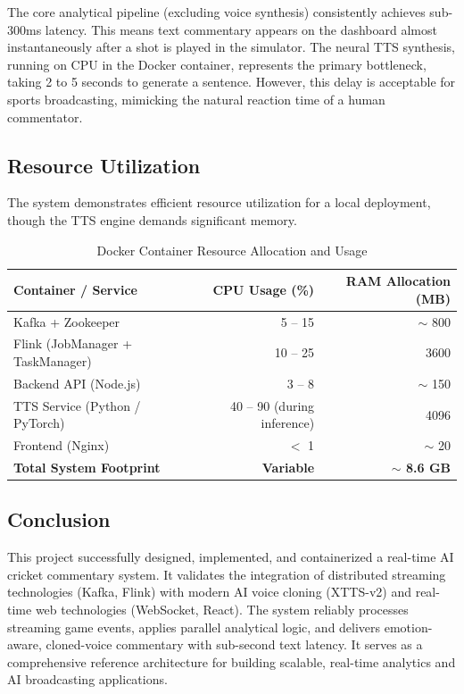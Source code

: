 \documentclass[12pt,a4paper]{article}
\begin{document}
The core analytical pipeline (excluding voice synthesis) consistently achieves sub-300ms latency. This means text commentary appears on the dashboard almost instantaneously after a shot is played in the simulator. The neural TTS synthesis, running on CPU in the Docker container, represents the primary bottleneck, taking 2 to 5 seconds to generate a sentence. However, this delay is acceptable for sports broadcasting, mimicking the natural reaction time of a human commentator.

\subsection{Resource Utilization}

The system demonstrates efficient resource utilization for a local deployment, though the TTS engine demands significant memory.

\begin{table}[H]
\centering
\caption{Docker Container Resource Allocation and Usage}
\label{tab:resources}
\begin{tabular}{@{}lrr@{}}
\toprule
\textbf{Container / Service} & \textbf{CPU Usage (\%)} & \textbf{RAM Allocation (MB)} \\
\midrule
Kafka + Zookeeper & 5 -- 15 & $\sim$ 800 \\
Flink (JobManager + TaskManager) & 10 -- 25 & 3600 \\
Backend API (Node.js) & 3 -- 8 & $\sim$ 150 \\
TTS Service (Python / PyTorch) & 40 -- 90 (during inference) & 4096 \\
Frontend (Nginx) & $<$ 1 & $\sim$ 20 \\
\midrule
\textbf{Total System Footprint} & \textbf{Variable} & \textbf{$\sim$ 8.6 GB} \\
\bottomrule
\end{tabular}
\end{table}

\subsection{Conclusion}

This project successfully designed, implemented, and containerized a real-time AI cricket commentary system. It validates the integration of distributed streaming technologies (Kafka, Flink) with modern AI voice cloning (XTTS-v2) and real-time web technologies (WebSocket, React). The system reliably processes streaming game events, applies parallel analytical logic, and delivers emotion-aware, cloned-voice commentary with sub-second text latency. It serves as a comprehensive reference architecture for building scalable, real-time analytics and AI broadcasting applications.
\end{document}
